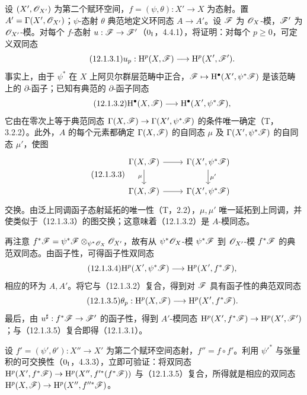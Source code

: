 设 $(X',\mathscr O_{X'})$ 为第二个赋环空间，$f=(\psi,\theta):X'\to X$ 为态射。置 $A'=\Gamma(X',\mathscr O_{X'})$；$\psi$-态射 $\theta$ 典范地定义环同态 $A\to A'$。设 $\mathscr F$ 为 $\mathscr O_X$-模，$\mathscr F'$ 为 $\mathscr O_{X'}$-模。对每个 $f$-态射 $u:\mathscr F\to\mathscr F'$（$0_{\mathrm I}$，4.4.1），将证明：对每个 $p\geq0$，可定义双同态
\begin{equation}\tag{12.1.3.1}
u_p:\mathrm H^p(X,\mathscr F)\longrightarrow\mathrm H^p(X',\mathscr F').
\end{equation}
事实上，由于 $\psi^*$ 在 $X$ 上阿贝尔群层范畴中正合，$\mathscr F\mapsto\mathrm H^\bullet(X',\psi^*\mathscr F)$ 是该范畴上的 $\partial$-函子；已知有典范的 $\partial$-函子同态
\begin{equation}\tag{12.1.3.2}
\mathrm H^\bullet(X,\mathscr F)\longrightarrow\mathrm H^\bullet(X',\psi^*\mathscr F),
\end{equation}
它由在零次上等于典范同态 $\Gamma(X,\mathscr F)\to\Gamma(X',\psi^*\mathscr F)$ 的条件唯一确定（T，3.2.2）。此外，$A$ 的每个元素都确定 $\Gamma(X,\mathscr F)$ 的自同态 $\mu$ 及 $\Gamma(X',\psi^*\mathscr F)$ 的自同态 $\mu'$，使图
\begin{equation}\tag{12.1.3.3}
\begin{tikzcd}
\Gamma(X,\F)\arrow[r]\arrow[d,"\mu"']&\Gamma(X',\psi^*\F)\arrow[d,"\mu'"]\\
\Gamma(X,\F)\arrow[r]&\Gamma(X',\psi^*\F)
\end{tikzcd}
\end{equation}
交换。由泛上同调函子态射延拓的唯一性（T，2.2），$\mu,\mu'$ 唯一延拓到上同调，并使类似于（12.1.3.3）的图交换；这意味着（12.1.3.2）是 $A$-模同态。

再注意 $f^*\mathscr F=\psi^*\mathscr F\otimes_{\psi^*\mathscr O_X}\mathscr O_{X'}$，故有从 $\psi^*\mathscr O_X$-模 $\psi^*\mathscr F$ 到 $\mathscr O_{X'}$-模 $f^*\mathscr F$ 的典范双同态。由函子性，可得函子性双同态
\begin{equation}\tag{12.1.3.4}
\mathrm H^p(X',\psi^*\mathscr F)\longrightarrow\mathrm H^p(X',f^*\mathscr F),
\end{equation}
相应的环为 $A,A'$。将它与（12.1.3.2）复合，得到对 $\mathscr F$ 具有函子性的典范双同态
\begin{equation}\tag{12.1.3.5}
\theta_p:\mathrm H^p(X,\mathscr F)\longrightarrow\mathrm H^p(X',f^*\mathscr F).
\end{equation}
最后，由 $u^\sharp:f^*\mathscr F\to\mathscr F'$ 的函子性，得到 $A'$-模同态 $\mathrm H^p(X',f^*\mathscr F)\to\mathrm H^p(X',\mathscr F')$；与（12.1.3.5）复合即得（12.1.3.1）。

设 $f'=(\psi',\theta'):X''\to X'$ 为第二个赋环空间态射，$f''=f\circ f'$。利用 $\psi'^*$ 与张量积的可交换性（$0_{\mathrm I}$，4.3.3），立即可验证：将双同态 $\mathrm H^p(X',f^*\mathscr F)\to\mathrm H^p(X'',f'^*(f^*\mathscr F))$ 与（12.1.3.5）复合，所得就是相应的双同态 $\mathrm H^p(X,\mathscr F)\to\mathrm H^p(X'',f''^*\mathscr F)$。

